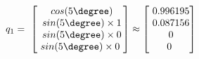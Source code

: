 \documentclass[preview]{standalone}
\begin{document}
\begin{center}
$q_1 = \
                \begin{bmatrix}\
                    cos(5\degree) \\\
                    sin(5\degree) \times 1 \\\
                    sin(5\degree) \times 0 \\\
                    sin(5\degree) \times 0\
                \end{bmatrix} \approx \begin{bmatrix}\
                    0.996195 \\\
                    0.087156 \\\
                    0 \\\
                    0\
                \end{bmatrix}$
\end{center}
\end{document}

